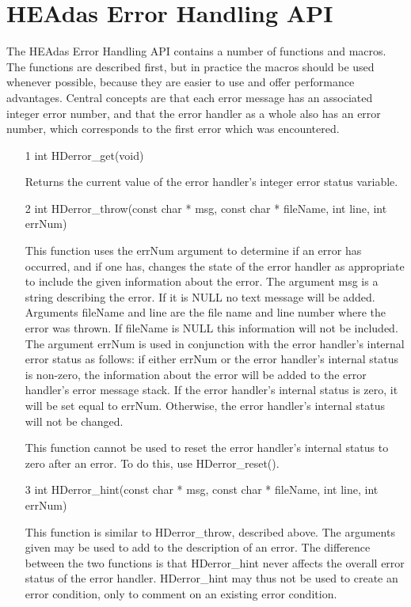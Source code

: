 \documentclass[11pt]{book}
\begin{document}
\section{HEAdas Error Handling API}

The HEAdas Error Handling API contains a number of
functions and macros. The functions are described first,
but in practice the macros should be used whenever possible,
because they are easier to use and offer performance advantages.
Central concepts are that each error message has an associated
integer error number, and that the error handler as a whole
also has an error number, which corresponds to the first error
which was encountered.

\begin{itemize}

\item[1] int HDerror\_get(void)

Returns the current value of the error handler's
integer error status variable.

\item[2] int HDerror\_throw(const char * msg, const char * fileName, int line, int errNum)

This function uses the errNum argument to determine if an
error has occurred, and if one has, changes the state of the error
handler as appropriate to include the given information about the
error. The argument msg is a string describing the error. If it
is NULL no text message will be added. Arguments fileName and
line are the file name and line number where the error was thrown.
If fileName is NULL this information will not be included. The
argument errNum is used in conjunction with the error handler's
internal error status as follows: if either errNum or the error
handler's internal status is non-zero, the information about the
error will be added to the error handler's error message stack.
If the error handler's internal status is zero, it will be set
equal to errNum. Otherwise, the error handler's internal status
will not be changed.

This function cannot be used to reset the error handler's internal
status to zero after an error. To do this, use HDerror\_reset().

\item[3] int HDerror\_hint(const char * msg, const char * fileName, int line, int errNum)

This function is similar to HDerror\_throw, described above.
The arguments given may be used to add to the description of
an error. The difference between the two functions is that
HDerror\_hint never affects the overall error status of the
error handler. HDerror\_hint may thus not be used to create
an error condition, only to comment on an existing error
condition.


\end{itemize}
\end{document}
